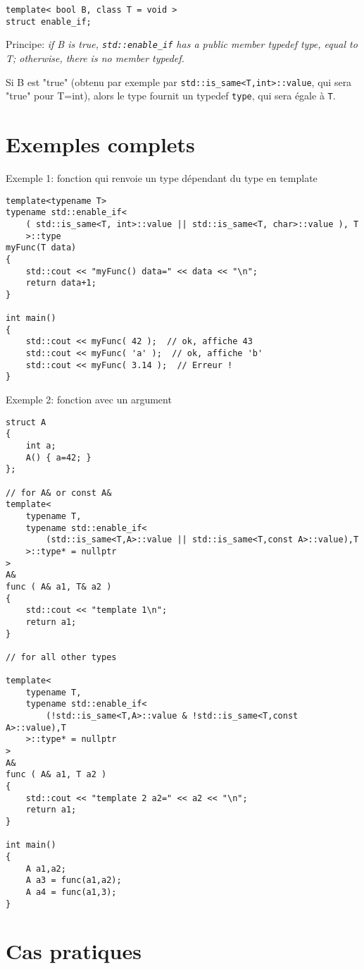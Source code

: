 \documentclass[11pt,a4paper]{article}
\begin{document}
\begin{lstlisting}
template< bool B, class T = void >
struct enable_if;
\end{lstlisting}

Principe:
{\em if B is true, {\tt std::enable\_if} has a public member typedef type, equal to T; otherwise, there is no member typedef. }

Si B est "true" (obtenu par exemple par {\tt std::is\_same<T,int>::value}, qui sera "true" pour T=int), alors le type fournit un typedef {\tt type}, qui sera égale à {\tt T}.


\section{Exemples complets}


Exemple 1: fonction qui renvoie un type dépendant du type en template

\begin{lstlisting}
template<typename T>
typename std::enable_if<
	( std::is_same<T, int>::value || std::is_same<T, char>::value ), T
	>::type
myFunc(T data)
{
	std::cout << "myFunc() data=" << data << "\n";
	return data+1;
}

int main()
{
    std::cout << myFunc( 42 );  // ok, affiche 43
    std::cout << myFunc( 'a' );  // ok, affiche 'b'
    std::cout << myFunc( 3.14 );  // Erreur !        
}
\end{lstlisting}



Exemple 2: fonction avec un argument

\begin{lstlisting}
struct A
{
    int a;
    A() { a=42; }
};

// for A& or const A&
template<
	typename T,
	typename std::enable_if<
		(std::is_same<T,A>::value || std::is_same<T,const A>::value),T
	>::type* = nullptr
> 
A&
func ( A& a1, T& a2 )
{
    std::cout << "template 1\n";
    return a1;
}

// for all other types

template<
	typename T,
	typename std::enable_if<
		(!std::is_same<T,A>::value & !std::is_same<T,const A>::value),T
	>::type* = nullptr
> 
A&
func ( A& a1, T a2 )
{
    std::cout << "template 2 a2=" << a2 << "\n";
    return a1;
}
 
int main()
{
    A a1,a2;
    A a3 = func(a1,a2);
    A a4 = func(a1,3);
}
\end{lstlisting}

\section{Cas pratiques}
\end{document}
